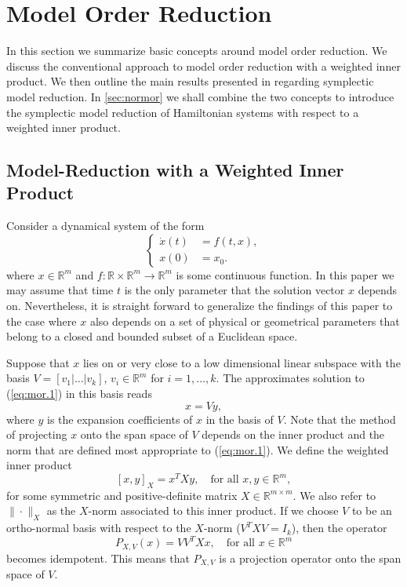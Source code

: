 \section{Model Order Reduction}
\label{sec:mor}

In this section we summarize basic concepts around model order reduction. We discuss the conventional approach to model order reduction with a weighted inner product. We then outline the main results presented in \cite{doi:10.1137/17M1111991} regarding symplectic model reduction. In \cref{sec:normor} we shall combine the two concepts to introduce the symplectic model reduction of Hamiltonian systems with respect to a weighted inner product.

\subsection{Model-Reduction with a Weighted Inner Product} \label{sec:mor.1}
Consider a dynamical system of the form
\begin{equation} \label{eq:mor.1}
\left\{
\begin{aligned}
	\dot x(t) &= f(t,x), \\
	x(0) &= x_0.
\end{aligned}
\right.
\end{equation}
where $x\in \mathbb R^{m}$ and $f:\mathbb R \times \mathbb R^{m} \to \mathbb R^{m}$ is some continuous function. In this paper we may assume that time $t$ is the only parameter that the solution vector $x$ depends on. Nevertheless, it is straight forward to generalize the findings of this paper to the case where $x$ also depends on a set of physical or geometrical parameters that belong to a closed and bounded subset of a Euclidean space.

Suppose that $x$ lies on or very close to a low dimensional linear subspace with the basis $V=[v_1|\dots|v_k]$, $v_i\in \mathbb R^{m}$ for $i=1,\dots,k$. The approximates solution to (\ref{eq:mor.1}) in this basis reads
\begin{equation} \label{eq:mor.2}
	x = Vy,
\end{equation}
where $y$ is the expansion coefficients of $x$ in the basis of $V$. Note that the method of projecting $x$ onto the span space of $V$ depends on the inner product and the norm that are defined most appropriate to (\ref{eq:mor.1}). We define the weighted inner product
\begin{equation} \label{eq:mor.3}
	[x,y]_X = x^TXy,\quad \text{for all } x,y \in \mathbb R^m,
\end{equation}
for some symmetric and positive-definite matrix $X\in \mathbb{R}^{m\times m}$. We also refer to $\|\cdot \|_X$ as the $X$-norm associated to this inner product. If we choose $V$ to be an ortho-normal basis with respect to the $X$-norm ($V^TXV=I_k$), then the operator
\begin{equation} \label{eq:mor.4}
	P_{X,V}(x) = VV^TXx, \quad \text{for all } x\in \mathbb R^{m}
\end{equation}
becomes idempotent. This means that $P_{X,V}$ is a projection operator onto the span space of $V$.

